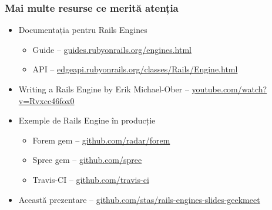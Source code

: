 \documentclass[compress]{beamer}
\begin{document}
\begin{frame}
\frametitle{Mai multe resurse ce merită atenția}

\begin{itemize}
  \item Documentația pentru Rails Engines
    \begin{itemize}
      \item Guide -- \href{http://guides.rubyonrails.org/engines.html}{guides.rubyonrails.org/engines.html}
      \item API -- \href{http://edgeapi.rubyonrails.org/classes/Rails/Engine.html}{edgeapi.rubyonrails.org/classes/Rails/Engine.html}
    \end{itemize}
  \item Writing a Rails Engine by Erik Michael-Ober -- \href{http://www.youtube.com/watch?v=Rvxcc46fox0}{youtube.com/watch?v=Rvxcc46fox0}
  \item Exemple de Rails Engine în producție
    \begin{itemize}
      \item Forem gem -- \href{https://github.com/radar/forem}{github.com/radar/forem}
      \item Spree gem -- \href{https://github.com/spree}{github.com/spree}
      \item Travis-CI -- \href{https://github.com/travis-ci}{github.com/travis-ci}
    \end{itemize}
  \item Această prezentare -- \href{https://github.com/stas/rails-engines-slides-geekmeet}{github.com/stas/rails-engines-slides-geekmeet}
\end{itemize}

\end{frame}
\end{document}
